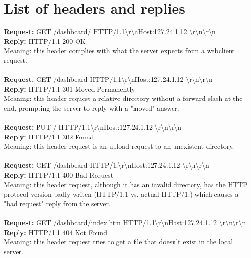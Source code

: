 \documentclass[11pt,a4paper]{report}
\begin{document}
    \section{List of headers and replies}
        \textbf{Request:} GET /dashboard/ HTTP/1.1\textbackslash r\textbackslash nHost:127.24.1.12 \textbackslash r\textbackslash n\textbackslash r\textbackslash n \\
        \textbf{Reply:} HTTP/1.1 200 OK \\
        Meaning: this header complies with what the server expects from a webclient request. \\
        \\
        \textbf{Request:} GET /dashboard HTTP/1.1\textbackslash r\textbackslash nHost:127.24.1.12 \textbackslash r\textbackslash n\textbackslash r\textbackslash n \\
        \textbf{Reply:} HTTP/1.1 301 Moved Permanently \\
        Meaning: this header request a relative directory without a forward slash at the end, prompting the server to reply with a "moved" answer. \\
        \\
        \textbf{Request:} PUT / HTTP/1.1\textbackslash r\textbackslash nHost:127.24.1.12 \textbackslash r\textbackslash n\textbackslash r\textbackslash n \\
        \textbf{Reply:} HTTP/1.1 302 Found \\
        Meaning: this header request is an upload request to an unexistent directory. \\
        \\
        \textbf{Request:} GET /dashboard HTTP/1.\textbackslash r\textbackslash nHost:127.24.1.12 \textbackslash r\textbackslash n\textbackslash r\textbackslash n \\
        \textbf{Reply:} HTTP/1.1 400 Bad Request \\
        Meaning: this header request, although it has an invalid directory, has the HTTP protocol version badly writen (HTTP/1.1 vs. actual HTTP/1.) which causes a "bad request" reply from the server. \\
        \\
        \textbf{Request:} GET /dashboard/index.htm HTTP/1.1\textbackslash r\textbackslash nHost:127.24.1.12 \textbackslash r\textbackslash n\textbackslash r\textbackslash n \\
        \textbf{Reply:} HTTP/1.1 404 Not Found \\
        Meaning: this header request tries to get a file that doesn't exist in the local server. \\
\end{document}
